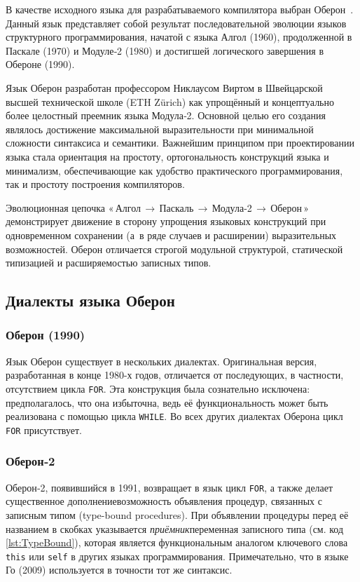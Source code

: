 \documentclass[utf8]{lgu}
\newcommand{\tire}{\unskip\nobreak\thinspace\textemdash\thinspace}
\newcommand{\code}[1]{{\normalsize\texttt{#1}}}
\begin{document}
\firstparskip В качестве исходного языка для разрабатываемого компилятора выбран Оберон~\cite{Oberon07Report}. Данный язык представляет собой результат последовательной эволюции языков структурного программирования, начатой с языка Алгол (1960), продолженной в Паскале (1970) и Модуле‑2 (1980) и достигшей логического завершения в Обероне (1990).

Язык Оберон разработан профессором Никлаусом Виртом в Швейцарской высшей технической школе (ETH Zürich) как упрощённый и концептуально более целостный преемник языка Модула‑2. Основной целью его создания являлось достижение максимальной выразительности при минимальной сложности синтаксиса и семантики. Важнейшим принципом при проектировании языка стала ориентация на простоту, ортогональность конструкций языка и минимализм, обеспечивающие как удобство практического программирования, так и простоту построения компиляторов.

Эволюционная цепочка «\,Алгол\,$\rightarrow$\,Паскаль\,$\rightarrow$\,Модула‑2\,$\rightarrow$\,\allowbreak Оберон\,» демонстрирует движение в сторону упрощения языковых конструкций при одновременном сохранении (а~в ряде случаев и расширении) выразительных возможностей. Оберон отличается строгой модульной структурой, статической типизацией и расширяемостью записных типов.

\subsection{Диалекты языка Оберон}

\subsubsection{Оберон (1990)}

\firstparskip Язык Оберон существует в нескольких диалектах. Оригинальная версия, разработанная в конце 1980-х годов, отличается от последующих, в частности, отсутствием цикла \code{FOR}. Эта конструкция была сознательно исключена: предполагалось, что она избыточна, ведь её функциональность может быть реализована с помощью цикла \code{WHILE}. Во всех других диалектах Оберона цикл \code{FOR} присутствует.

\subsubsection{Оберон‑2}

\label{Oberon2}

\firstparskip Оберон‑2, появившийся в 1991, возвращает в язык цикл \code{FOR}, а также делает существенное дополнение\tire возможность объявления процедур, связанных с записным типом (type-bound procedures). При объявлении процедуры перед её названием в скобках указывается \textit{приёмник}\tire переменная записного типа (см. код \ref{lst:TypeBound}), которая является функциональным аналогом ключевого слова \code{this} или \code{self} в других языках программирования. Примечательно, что в языке Го (2009) используется в точности тот же синтаксис.
\end{document}
